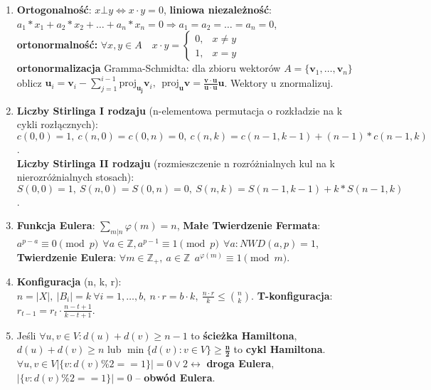 \documentclass[12pt]{article}
\begin{document}
\begin{enumerate}
        \item \textbf{Ortogonalność}: $x \bot y \Leftrightarrow x \cdot y = 0$, \textbf{liniowa niezależność}:\\
        $a_1 * x_1 + a_2 * x_2 + \ldots + a_n * x_n = 0 \Rightarrow a_1 = a_2 = \ldots = a_n = 0$,\\
        \textbf{ortonormalność:} $\forall x,y \in A  \quad   x \cdot y =  \begin{cases}
                                                                              0, & x \ne y \\
                                                                              1, & x = y
        \end{cases}$\\
        \textbf{ortonormalizacja} Gramma-Schmidta:
        dla zbioru wektorów $A = \{\mathbf{v}_1, \dots,  \mathbf{v}_n\}$ oblicz
        $\mathbf{u}_i = \mathbf{v}_i - \sum_{j=1}^{i-1} \mathrm{proj}_\mathbf{u_j} \mathbf{v}_i, ~~
        \mathrm{proj}_\mathbf{u} \mathbf{v} = \frac{\mathbf{v} \cdot \mathbf{u}}{\mathbf{u} \cdot \mathbf{u}} \mathbf{u}$.
        Wektory u znormalizuj.

        \item \textbf{Liczby Stirlinga I rodzaju} (n-elementowa permutacja o rozkładzie na k cykli rozłącznych):
        $c(0,0) = 1, ~ c(n,0) = c(0,n) = 0, ~ c(n,k) = c(n-1, k-1) + (n-1) * c(n-1, k)$.\\
        \textbf{Liczby Stirlinga II rodzaju} (rozmieszczenie n rozróżnialnych kul na k nierozróżnialnych stosach):
        $S(0,0) = 1, ~ S(n,0) = S(0,n) = 0, ~ S(n,k) = S(n-1, k-1) + k * S(n-1, k)$.

        \item \textbf{Funkcja Eulera}: $\sum_{m|n}^{} \varphi(m) = n$, \textbf{Małe Twierdzenie Fermata}:
        $a^{p-a} \equiv 0 \pmod p ~~ \forall a \in \mathbb{Z}, a^{p-1} \equiv 1 \pmod p ~~ \forall a : NWD(a,p) = 1$,
        \textbf{Twierdzenie Eulera}: $\forall m \in \mathbb{Z_+}, ~ a \in \mathbb{Z} ~~ a^{\varphi (m)} \equiv 1 \pmod m$.

        \item \textbf{Konfiguracja} (n, k, r): $n = |X|, ~ |B_i| = k ~ \forall i = 1, \dots, b, ~ n \cdot r = b \cdot k, ~
        \frac{n\cdot r}{k}\leq {n\choose k}$. \textbf{T-konfiguracja}: $r_{t-1} = r_t \cdot \frac{n-t+1}{k-t+1}$.

        \item Jeśli $\forall u, v \in V: d(u) + d(v) \geq n-1$ to \textbf{ścieżka Hamiltona}, $d(u) + d(v) \geq n$ lub
        $\min\{d(v) : v \in V\} \geq \mathbf{\frac{n}{2}}$ to \textbf{cykl Hamiltona}. $\forall u, v \in V
        |\{v: d(v) \% 2 == 1\}| = 0 \vee 2 \leftrightarrow$ \textbf{droga Eulera}, $|\{v: d(v) \% 2 == 1\}| = 0$ --
        \textbf{obwód Eulera}.


\end{enumerate}
\end{document}

